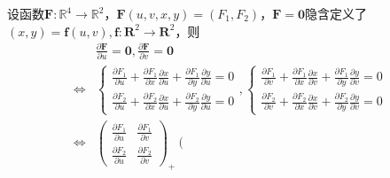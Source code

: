 \documentclass[main.tex]{subfiles}
\begin{document}
\begin{example}\label{exp:II.12.2}
    设函数$\mathbf{F}:\mathbb{R}^4\rightarrow\mathbb{R}^2$，$\mathbf{F}\left(u,v,x,y\right)=\left(F_1,F_2\right)$，$\mathbf{F}=\mathbf{0}$隐含定义了$\left(x,y\right)=\mathbf{f}\left(u,v\right),\mathbf{f}:\mathbf{R}^2\rightarrow\mathbf{R}^2$，则
    \begin{align*}
                        & \frac{\partial \mathbf{F}}{\partial u}=\mathbf{0},\frac{\partial \mathbf{F}}{\partial v}=\mathbf{0}                                                                                                                                                                                                                                                                                                                                                                              \\
        \Leftrightarrow & \left\{\begin{array}{l}
                                     \frac{\partial F_1}{\partial u}+\frac{\partial F_1}{\partial x}\frac{\partial x}{\partial u}+\frac{\partial F_1}{\partial y}\frac{\partial y}{\partial u}=0 \\
                                     \frac{\partial F_2}{\partial u}+\frac{\partial F_2}{\partial x}\frac{\partial x}{\partial u}+\frac{\partial F_2}{\partial y}\frac{\partial y}{\partial u}=0
                                 \end{array}\right.,\left\{\begin{array}{l}
                                                               \frac{\partial F_1}{\partial v}+\frac{\partial F_1}{\partial x}\frac{\partial x}{\partial v}+\frac{\partial F_1}{\partial y}\frac{\partial y}{\partial v}=0 \\
                                                               \frac{\partial F_2}{\partial v}+\frac{\partial F_2}{\partial x}\frac{\partial x}{\partial v}+\frac{\partial F_2}{\partial y}\frac{\partial y}{\partial v}=0
                                                           \end{array}\right.                                                                                                                                                                                                                                                                                     \\
        \Leftrightarrow & \left(\begin{array}{cc}
                                        \frac{\partial F_1}{\partial u} & \frac{\partial F_1}{\partial v} \\\frac{\partial F_2}{\partial u}&\frac{\partial F_2}{\partial v}\end{array}\right)_+\left(\begin{array}{cc}

\end{array}
\end{align*}
\end{example}
\end{document}
